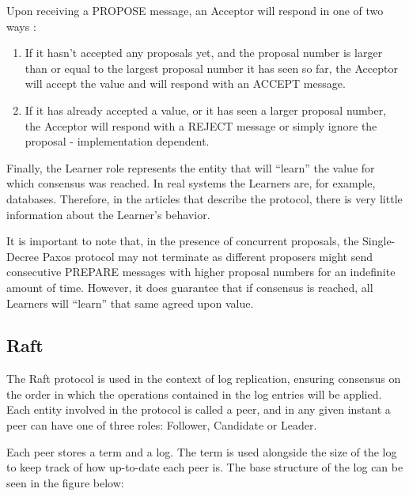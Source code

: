 Upon receiving a PROPOSE message, an Acceptor will respond in one of two ways \cite{paxos_made_simple}:

\begin{enumerate}
  \item If it hasn’t accepted any proposals yet, and the proposal number is larger than or equal to the largest proposal number it has seen so far, the Acceptor will accept the value and will respond with an ACCEPT message.
  \item If it has already accepted a value, or it has seen a larger proposal number, the Acceptor will respond with a REJECT message or simply ignore the proposal - implementation dependent.
\end{enumerate}

Finally, the Learner role represents the entity that will “learn” the value for which consensus was reached. In real systems the Learners are, for example, databases. Therefore, in the articles that describe the protocol, there is very little information about the Learner’s behavior.


It is important to note that, in the presence of concurrent proposals, the Single-Decree Paxos protocol may not terminate as different proposers might send consecutive PREPARE messages with higher proposal numbers for an indefinite amount of time. However, it does guarantee that if consensus is reached, all Learners will “learn” that same agreed upon value.




\subsection{Raft}

The Raft protocol \cite{raft} is used in the context of log replication, ensuring consensus on the order in which the operations contained in the log entries will be applied. Each entity involved in the protocol is called a peer, and in any given instant a peer can have one of three roles: Follower, Candidate or Leader.

Each peer stores a term and a log. The term is used alongside the size of the log to keep track of how up-to-date each peer is. The base structure of the log can be seen in the figure below:


